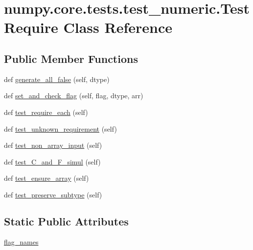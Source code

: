 \hypertarget{classnumpy_1_1core_1_1tests_1_1test__numeric_1_1TestRequire}{}\section{numpy.\+core.\+tests.\+test\+\_\+numeric.\+Test\+Require Class Reference}
\label{classnumpy_1_1core_1_1tests_1_1test__numeric_1_1TestRequire}
\subsection*{Public Member Functions}
\begin{DoxyCompactItemize}
\item 
def \hyperlink{classnumpy_1_1core_1_1tests_1_1test__numeric_1_1TestRequire_afdc40039496fa6124f97aa347d7a3ce0}{generate\+\_\+all\+\_\+false} (self, dtype)
\item 
def \hyperlink{classnumpy_1_1core_1_1tests_1_1test__numeric_1_1TestRequire_a5d538c120e3055d034a6428f85cbcf4c}{set\+\_\+and\+\_\+check\+\_\+flag} (self, flag, dtype, arr)
\item 
def \hyperlink{classnumpy_1_1core_1_1tests_1_1test__numeric_1_1TestRequire_a100542c4693871d967c4142639543b1e}{test\+\_\+require\+\_\+each} (self)
\item 
def \hyperlink{classnumpy_1_1core_1_1tests_1_1test__numeric_1_1TestRequire_a8ab76a54d08571d7870af27668552c64}{test\+\_\+unknown\+\_\+requirement} (self)
\item 
def \hyperlink{classnumpy_1_1core_1_1tests_1_1test__numeric_1_1TestRequire_a0b1a2a5f923f915b2fdb5449b72f08a6}{test\+\_\+non\+\_\+array\+\_\+input} (self)
\item 
def \hyperlink{classnumpy_1_1core_1_1tests_1_1test__numeric_1_1TestRequire_a38de3999c63e8f7813af58a0c9d51270}{test\+\_\+\+C\+\_\+and\+\_\+\+F\+\_\+simul} (self)
\item 
def \hyperlink{classnumpy_1_1core_1_1tests_1_1test__numeric_1_1TestRequire_ab643fe91d052af5382be1e590d9f836b}{test\+\_\+ensure\+\_\+array} (self)
\item 
def \hyperlink{classnumpy_1_1core_1_1tests_1_1test__numeric_1_1TestRequire_a2b1e37311012dc786abe06c7120a58bd}{test\+\_\+preserve\+\_\+subtype} (self)
\end{DoxyCompactItemize}
\subsection*{Static Public Attributes}
\begin{DoxyCompactItemize}
\item 
\hyperlink{classnumpy_1_1core_1_1tests_1_1test__numeric_1_1TestRequire_affb5ac36d38365e8c2b5cf4b78f0032c}{flag\+\_\+names}
\end{DoxyCompactItemize}



